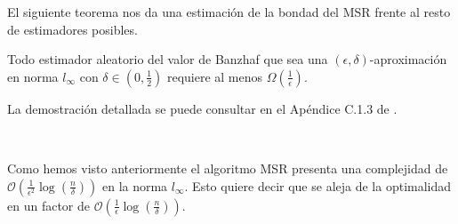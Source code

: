 El siguiente teorema nos da una estimación de la bondad del
MSR frente al resto de estimadores posibles.

\begin{theorem}
  Todo estimador aleatorio del valor de Banzhaf
  que sea una $(\epsilon,\delta)$-aproximación en norma
  $l_{\infty}$ con $\delta \in (0,\frac{1}{2})$ requiere
  al menos $\Omega(\frac{1}{\epsilon})$.
\end{theorem}

La demostración detallada se puede consultar en el Apéndice
C.1.3 de \cite{dataBanzhaf}.

\

Como hemos visto anteriormente el algoritmo MSR presenta
una complejidad de $\mathcal{O}(\frac{1}{\epsilon^2}
\log(\frac{n}{\delta}))$ en la norma $l_{\infty}$.
Esto quiere decir que se aleja de la optimalidad
en un factor de $\mathcal{O}(\frac{1}{\epsilon}
\log(\frac{n}{\delta}))$.